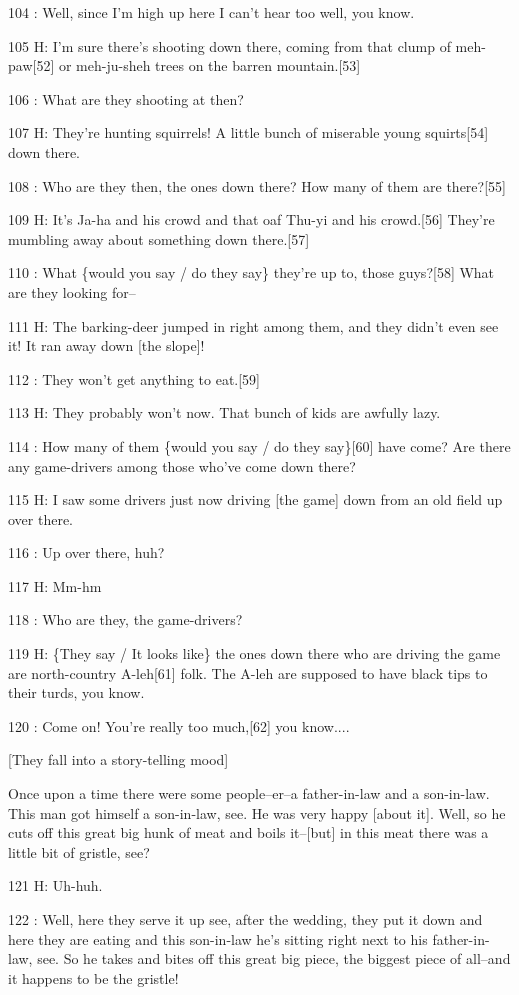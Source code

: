 104  : Well, since I'm high up here I can't hear too well, you know.

105 H: I'm sure there's shooting down there, coming from that clump of meh-paw[52]
or meh-ju-sheh trees on the barren mountain.[53]

106  : What are they shooting at then?

107 H: They're hunting squirrels! A little bunch of miserable young squirts[54]
down there.

108  : Who are they then, the ones down there? How many of them are there?[55]

109 H: It's Ja-ha and his crowd and that oaf Thu-yi and his crowd.[56] They're
mumbling away about something down there.[57]

110  : What \{would you say / do they say\} they're up to, those guys?[58]  What
are they looking for--

111 H: The barking-deer jumped in right among them, and they didn't even see it!
It ran away down [the slope]!

112  : They won't get anything to eat.[59]

113 H: They probably won't now. That bunch of kids are awfully lazy.

114  : How many of them \{would you say / do they say\}[60] have come? Are there
any game-drivers among those who've come down there?

115 H: I saw some drivers just now driving [the game] down from an old field up
over there.

116  : Up over there, huh?

117 H: Mm-hm

118  : Who are they, the game-drivers?

119 H: \{They say / It looks like\} the ones down there who are driving the game
are north-country A-leh[61] folk. The A-leh are supposed to have black tips to
their turds, you know.

120  : Come on! You're really too much,[62] you know....

[They fall into a story-telling mood]

Once upon a time there were some people--er--a father-in-law and a son-in-law.
This man got himself a son-in-law, see. He was very happy [about it]. Well, so
he cuts off this great big hunk of meat and boils it--[but] in this meat there
was a little bit of gristle, see?

121 H: Uh-huh.

122  : Well, here they serve it up see, after the wedding, they put it down and
here they are eating and this son-in-law he's sitting right next to his father-in-law,
see. So he takes and bites off this great big piece, the biggest piece of all--and
it happens to be the gristle!

